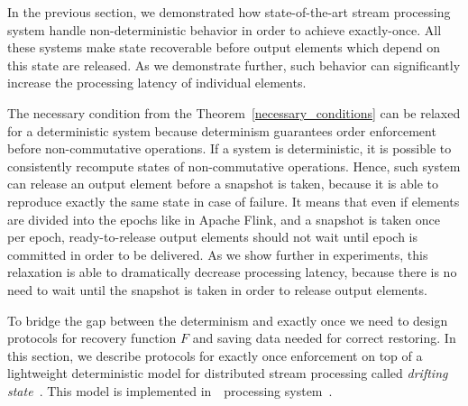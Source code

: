 
\label {fs-consistency-section}

In the previous section, we demonstrated how state-of-the-art stream processing system handle non-deterministic behavior in order to achieve exactly-once. All these systems make state recoverable before output elements which depend on this state are released. As we demonstrate further, such behavior can significantly increase the processing latency of individual elements.

The necessary condition from the Theorem~\ref{necessary_conditions} can be relaxed for a deterministic system because determinism guarantees order enforcement before non-commutative operations. If a system is deterministic, it is possible to consistently recompute states of non-commutative operations. Hence, such system can release an output element before a snapshot is taken, because it is able to reproduce exactly the same state in case of failure. It means that even if elements are divided into the epochs like in Apache Flink, and a snapshot is taken once per epoch, ready-to-release output elements should not wait until epoch is committed in order to be delivered. As we show further in experiments, this relaxation is able to dramatically decrease processing latency, because there is no need to wait until the snapshot is taken in order to release output elements.




To bridge the gap between the determinism and exactly once we need to design protocols for recovery function $F$ and saving data needed for correct restoring. In this section, we describe protocols for exactly once enforcement on top of a lightweight deterministic model for distributed stream processing called {\em drifting state}~\cite{we2018adbis}. This model is implemented in~\FlameStream\ processing system~\cite{we2018beyondmr}.

